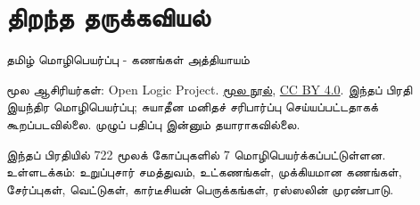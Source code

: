 \documentclass[11pt,a4paper,openany]{memoir}
\begin{document}
\raggedright
\pagestyle{plain}
\chapter*{திறந்த தருக்கவியல்}
\noindent தமிழ் மொழிபெயர்ப்பு - கணங்கள் அத்தியாயம்

\noindent மூல ஆசிரியர்கள்: Open Logic Project.
\href{https://github.com/OpenLogicProject/OpenLogic}{மூல நூல்},
\href{https://creativecommons.org/licenses/by/4.0/}{CC BY 4.0}.
இந்தப் பிரதி இயந்திர மொழிபெயர்ப்பு; சுயாதீன மனிதச் சரிபார்ப்பு செய்யப்பட்டதாகக்
கூறப்படவில்லை. முழுப் பதிப்பு இன்னும் தயாராகவில்லை.

\noindent இந்தப் பிரதியில் 722 மூலக் கோப்புகளில் 7 மொழிபெயர்க்கப்பட்டுள்ளன.
உள்ளடக்கம்: உறுப்புசார் சமத்துவம், உட்கணங்கள், முக்கியமான கணங்கள்,
சேர்ப்புகள், வெட்டுகள், கார்டீசியன் பெருக்கங்கள், ரஸ்ஸலின் முரண்பாடு.



\end{document}
